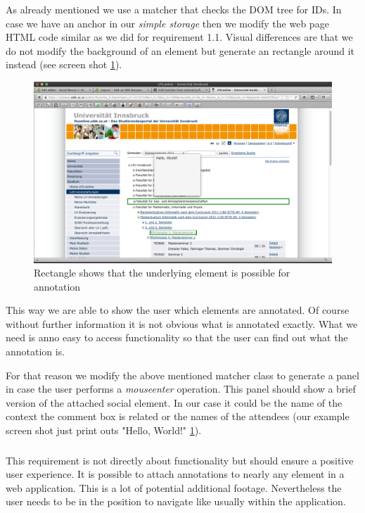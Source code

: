 As already mentioned we use a matcher that checks the DOM tree for IDs. In case we have an anchor in our \emph{simple storage} then we modify the web page HTML code similar as we did for requirement 1.1. Visual differences are that we do
 not
 modify the background of an element but generate an rectangle around it instead (see screen shot \ref{annotation-rectangle-sample2}). 

\begin{figure} \centering
		\includegraphics[width=12cm]{images/annotation-rectangle-sample2.png}
		\caption{Rectangle shows that the underlying element is possible for annotation}
		\label{annotation-rectangle-sample2}
\end{figure} 

This way we are able to show the user which elements are annotated. Of course without further information it is not obvious what is annotated exactly. What we need is anno easy to access functionality so that the user can find out what the annotation is. 

For that reason we modify the above mentioned matcher class to generate a panel in case the user performs a \emph{mouseenter} operation. This panel should show a brief version of the attached social element. In our case it could be the name of the context the comment box is related or the names of the attendees (our example screen shot just print outs "Hello, World!" \ref{annotation-rectangle-sample2}). 

\subsubsection[User View Management]{\reqPii}\label{user-disturbance}

This requirement is not directly about functionality but should ensure a positive user experience. It is possible to attach annotations to nearly any element in a web application. This is a lot of potential additional footage. Nevertheless the user needs to be in the position to navigate like usually within the application. 

